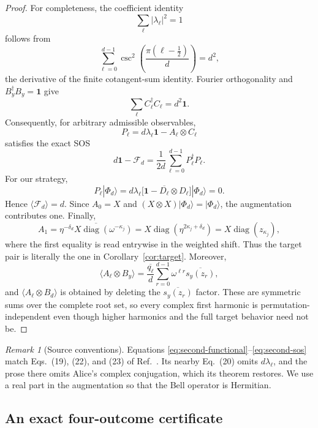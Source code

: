 \documentclass[11pt]{article}
\theoremstyle{remark}
\newtheorem{remark}[theorem]{Remark}
\newcommand{\Id}{\mathbf 1}
\newcommand{\cF}{\mathcal F}
\newcommand{\absop}[1]{\lvert #1\rvert}
\begin{document}
\begin{proof}
For completeness, the coefficient identity
\[
\sum_\ell\absop{\lambda_\ell}^2=1
\]
follows from
\[
\sum_{\ell=0}^{d-1}
\csc^2\!\left(\frac{\pi(\ell-\tfrac12)}d\right)=d^2,
\]
the derivative of the finite cotangent-sum identity.  Fourier orthogonality
and \(B_y^\dagger B_y=\Id\) give
\[
\sum_\ell C_\ell^\dagger C_\ell=d^2\Id.
\]
Consequently, for arbitrary admissible observables,
\[
P_\ell=d\lambda_\ell\Id-A_\ell\otimes C_\ell
\]
satisfies the exact SOS
\begin{equation}
d\Id-\cF_d
=\frac1{2d}\sum_{\ell=0}^{d-1}P_\ell^\dagger P_\ell.
\label{eq:second-sos}
\end{equation}
For our strategy,
\[
P_\ell|\Phi_d\rangle
=d\lambda_\ell
\bigl[\Id-\overline{D_\ell}\otimes D_\ell\bigr]
|\Phi_d\rangle=0.
\]
Hence \(\langle\cF_d\rangle=d\).  Since \(A_0=X\) and
\((X\otimes X)|\Phi_d\rangle=|\Phi_d\rangle\), the augmentation contributes
one.  Finally,
\[
A_1
=
\overline{\eta^{-\delta_d}
X\operatorname{diag}(\omega^{-\kappa_j})}
=X\operatorname{diag}(\eta^{2\kappa_j+\delta_d})
=X\operatorname{diag}(z_{\kappa_j}),
\]
where the first equality is read entrywise in the weighted shift.  Thus the
target pair is literally the one in Corollary~\ref{cor:target}.  Moreover,
\[
\langle A_\ell\otimes B_y\rangle
=
\frac{\overline{q_\ell}}d
\sum_{r=0}^{d-1}
\omega^{\ell r}\overline{s_y(z_r)},
\]
and \(\langle A_\ell\otimes B_d\rangle\) is obtained by deleting the
\(\overline{s_y(z_r)}\) factor.  These are symmetric sums over the complete
root set, so every complex first harmonic is permutation-independent even
though higher harmonics and the full target behavior need not be.
\end{proof}

\begin{remark}[Source conventions]
Equations \eqref{eq:second-functional}--\eqref{eq:second-sos} match
Eqs.~(19), (22), and (23) of Ref.~\cite{PeritoEtAl2026}.  Its nearby
Eq.~(20) omits \(d\lambda_\ell\), and the prose there omits Alice's complex
conjugation, which its theorem restores.  We use a real part in the
augmentation so that the Bell operator is Hermitian.
\end{remark}

\subsection{An exact four-outcome certificate}
\end{document}
